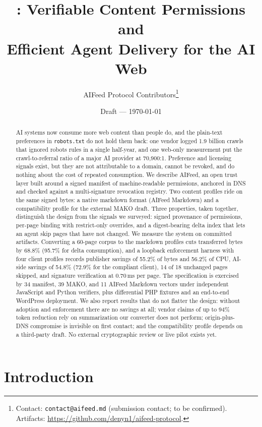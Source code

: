 \documentclass[11pt]{article}
\title{\aifeed{}: Verifiable Content Permissions and\\
Efficient Agent Delivery for the AI Web}
\author{AIFeed Protocol Contributors\thanks{Contact: \texttt{contact@aifeed.md}
(submission contact; to be confirmed). Artifacts:
\url{https://github.com/denyn1/aifeed-protocol}.}}
\date{Draft --- \today}
\newcommand{\aifeed}{AIFeed}
\newcommand{\aimd}{AIFeed Markdown}
\newcommand{\mako}{MAKO}
\newcommand{\code}[1]{\texttt{#1}}
\begin{document}
\maketitle

\begin{abstract}
AI systems now consume more web content than people do, and the plain-text preferences in
\code{robots.txt} do not hold them back: one vendor logged 1.9 billion crawls that ignored
robots rules in a single half-year, and one web-only measurement put the crawl-to-referral
ratio of a major AI provider at 70{,}900:1. Preference and licensing signals exist, but
they are not attributable to a domain, cannot be revoked, and do nothing about the cost of
repeated consumption. We describe \aifeed{}, an open trust layer built around a signed
manifest of machine-readable permissions, anchored in DNS and checked against a
multi-signature revocation registry. Two content profiles ride on the same signed bytes: a
native markdown format (\aimd{}) and a compatibility profile for the external \mako{}
draft. Three properties, taken together, distinguish the design from the signals we
surveyed: signed provenance of permissions, per-page binding with restrict-only overrides,
and a digest-bearing delta index that lets an agent skip pages that have not changed.
We measure the system on committed artifacts. Converting a 60-page corpus to the markdown
profiles cuts transferred bytes by 68.8\% (95.7\% for delta consumption), and a loopback
enforcement harness with four client profiles records publisher savings of 55.2\% of bytes
and 56.2\% of CPU, AI-side savings of 54.8\% (72.9\% for the compliant client), 14 of 18
unchanged pages skipped, and signature verification at 0.70\,ms per page. The
specification is exercised by 34 manifest, 39 \mako{}, and 11 \aimd{} vectors under
independent JavaScript and Python verifiers, plus differential PHP fixtures and an
end-to-end WordPress deployment. We also report results that do not flatter the design:
without adoption and enforcement there are no savings at all; vendor claims of up to 94\%
token reduction rely on summarization our converter does not perform; origin-plus-DNS
compromise is invisible on first contact; and the compatibility profile depends on a
third-party draft. No external cryptographic review or live pilot exists yet.
\end{abstract}

\section{Introduction}
\end{document}
